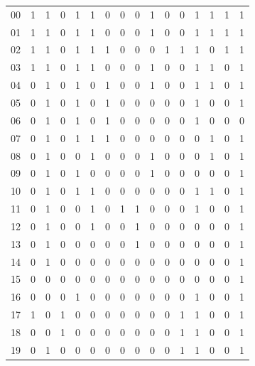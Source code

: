 \begin{esempio}
\begin{table}[H]
\begin{tabular}{c|ccccccccccccccc}
    00 & 1 & 1 & 0 & 1 & 1 & 0 & 0 & 0 & 1 & 0 & 0 & 1 & 1 & 1 & 1 \\
    01 & 1 & 1 & 0 & 1 & 1 & 0 & 0 & 0 & 1 & 0 & 0 & 1 & 1 & 1 & 1 \\
    02 & 1 & 1 & 0 & 1 & 1 & 1 & 0 & 0 & 0 & 1 & 1 & 1 & 0 & 1 & 1 \\
    03 & 1 & 1 & 0 & 1 & 1 & 0 & 0 & 0 & 1 & 0 & 0 & 1 & 1 & 0 & 1 \\
    04 & 0 & 1 & 0 & 1 & 0 & 1 & 0 & 0 & 1 & 0 & 0 & 1 & 1 & 0 & 1 \\
    05 & 0 & 1 & 0 & 1 & 0 & 1 & 0 & 0 & 0 & 0 & 0 & 1 & 0 & 0 & 1 \\
    06 & 0 & 1 & 0 & 1 & 0 & 1 & 0 & 0 & 0 & 0 & 0 & 1 & 0 & 0 & 0 \\
    07 & 0 & 1 & 0 & 1 & 1 & 1 & 0 & 0 & 0 & 0 & 0 & 0 & 1 & 0 & 1 \\
    08 & 0 & 1 & 0 & 0 & 1 & 0 & 0 & 0 & 1 & 0 & 0 & 0 & 1 & 0 & 1 \\
    09 & 0 & 1 & 0 & 1 & 0 & 0 & 0 & 0 & 1 & 0 & 0 & 0 & 0 & 0 & 1 \\
    10 & 0 & 1 & 0 & 1 & 1 & 0 & 0 & 0 & 0 & 0 & 0 & 1 & 1 & 0 & 1 \\
    11 & 0 & 1 & 0 & 0 & 1 & 0 & 1 & 1 & 0 & 0 & 0 & 1 & 0 & 0 & 1 \\
    12 & 0 & 1 & 0 & 0 & 1 & 0 & 0 & 1 & 0 & 0 & 0 & 0 & 0 & 0 & 1 \\
    13 & 0 & 1 & 0 & 0 & 0 & 0 & 0 & 1 & 0 & 0 & 0 & 0 & 0 & 0 & 1 \\
    14 & 0 & 1 & 0 & 0 & 0 & 0 & 0 & 0 & 0 & 0 & 0 & 0 & 0 & 0 & 1 \\
    15 & 0 & 0 & 0 & 0 & 0 & 0 & 0 & 0 & 0 & 0 & 0 & 0 & 0 & 0 & 1 \\
    16 & 0 & 0 & 0 & 1 & 0 & 0 & 0 & 0 & 0 & 0 & 0 & 1 & 0 & 0 & 1 \\
    17 & 1 & 0 & 1 & 0 & 0 & 0 & 0 & 0 & 0 & 0 & 1 & 1 & 0 & 0 & 1 \\
    18 & 0 & 0 & 1 & 0 & 0 & 0 & 0 & 0 & 0 & 0 & 1 & 1 & 0 & 0 & 1 \\ 
    19 & 0 & 1 & 0 & 0 & 0 & 0 & 0 & 0 & 0 & 0 & 1 & 1 & 0 & 0 & 1
  \end{tabular}
\end{table}
\end{esempio}
